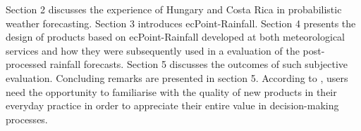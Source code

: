 Section 2 discusses the experience of Hungary and Costa Rica in probabilistic weather forecasting. Section 3  introduces ecPoint-Rainfall. Section 4 presents the design of products based on ecPoint-Rainfall developed at both meteorological services and how they were subsequently used in a  evaluation of the post-processed rainfall forecasts. Section 5 discusses the outcomes of such subjective evaluation. Concluding remarks are presented in section 5.
According to \citet{Fundel2019}, users need the opportunity to familiarise with the quality of new products in their everyday practice in order to appreciate their entire value in decision-making processes.